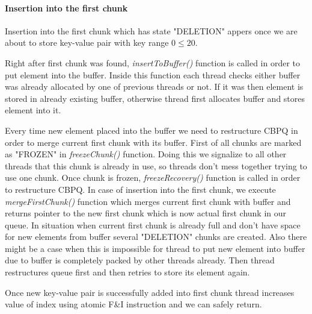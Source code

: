 \documentclass{article}
\begin{document}
\paragraph{Insertion into the first chunk}\mbox{}\par
Insertion into the first chunk which has state "DELETION" appers once we are about to store key-value pair with key range $0 \leqslant 20$.\par
Right after first chunk was found, \textit{insertToBuffer()} function is called in order to put element into the buffer.
Inside this function each thread checks either buffer was already allocated by one of previous threads or not. If it was then element is stored in already existing buffer, otherwise thread first allocates buffer and stores element into it.\par
Every time new element placed into the buffer we need to restructure CBPQ in order to merge current first chunk with its buffer. First of all chunks are marked as "FROZEN" in \textit{freezeChunk()} function. Doing this we signalize to all other threads that this chunk is already in use, so threads don't mess together trying to use one chunk. Once chunk is frozen, \textit{freezeRecovery()} function is called in order to restructure CBPQ. In case of insertion into the first chunk, we execute \textit{mergeFirstChunk()} function which merges current first chunk with buffer and returns pointer to the new first chunk which is now actual first chunk in our queue. In situation when current first chunk is already full and don't have space for new elements from buffer several "DELETION" chunks are created. Also there might be a case when this is impossible for thread to put new element into buffer due to buffer is completely packed by other threads already. Then thread restructures queue first and then retries to store its element again.\par
Once new key-value pair is successfully added into first chunk thread increases value of index using atomic F\&I instruction and we can safely return.
\pagebreak
\end{document}
